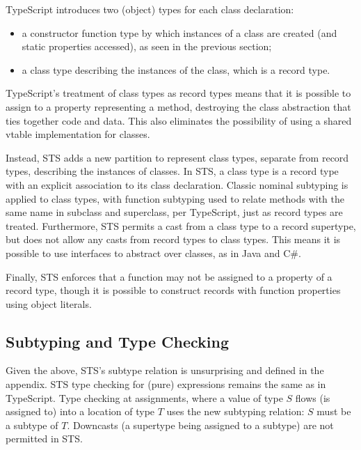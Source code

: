 TypeScript introduces two (object) types for each class declaration:
\begin{itemize}
\item a constructor function type by which instances of a class
are created (and static properties accessed), as seen in the previous section; 
\item a class type describing the instances of the class, which is a record type.
\end{itemize}
TypeScript's treatment of class types as record types
means that it is possible to assign to a property representing a method, 
destroying the class abstraction that ties together code and data. 
This also eliminates the possibility of using a shared vtable implementation for classes.

Instead, STS adds a new partition to represent class types, separate from record types, 
describing the instances of classes. In STS, a class type is a 
record type with an explicit association to its class declaration.
Classic nominal subtyping is applied to class types, with function subtyping used to relate methods with 
the same name in subclass and superclass, per TypeScript, just as record types are treated.
Furthermore, STS permits a cast from a class type
to a record supertype, but does not allow any casts from record types to class types. This means
it is possible to use interfaces to abstract over classes, as in Java and C\#. 

Finally, STS enforces that a function may not be assigned to a property of a record type, 
though it is possible to construct records with function properties using object literals. 

\subsection{Subtyping and Type Checking}

Given the above, STS's subtype relation is unsurprising and defined in the appendix.
STS type checking for (pure) expressions remains the same as in TypeScript.
Type checking at assignments, where a value of type $S$ flows (is assigned to) 
into a location of type $T$ uses the new subtyping relation: $S$
must be a subtype of $T$.  Downcasts (a supertype being assigned to a subtype)
are not permitted in STS.



